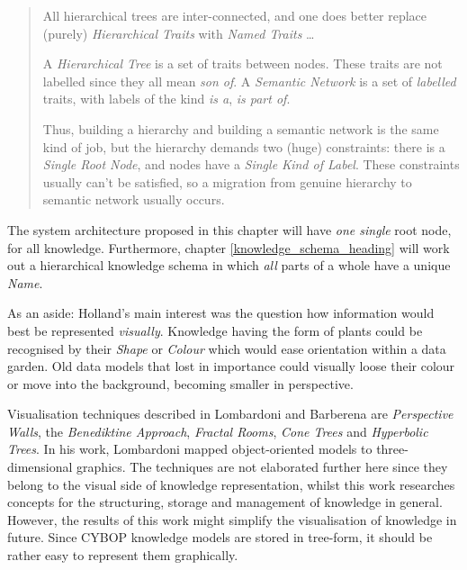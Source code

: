 \begin{quote}
    All hierarchical trees are inter-connected, and one does better replace
    (purely) \emph{Hierarchical Traits} with \emph{Named Traits} \ldots

    A \emph{Hierarchical Tree} is a set of traits between nodes. These traits
    are not labelled since they all mean \emph{son of}.
    A \emph{Semantic Network} is a set of \emph{labelled} traits, with labels
    of the kind \emph{is a}, \emph{is part of}.

    Thus, building a hierarchy and building a semantic network is the same kind
    of job, but the hierarchy demands two (huge) constraints: there is a
    \emph{Single Root Node}, and nodes have a \emph{Single Kind of Label}.
    These constraints usually can't be satisfied, so a migration from genuine
    hierarchy to semantic network usually occurs.
\end{quote}

The system architecture proposed in this chapter will have \emph{one single}
root node, for all knowledge. Furthermore, chapter \ref{knowledge_schema_heading}
will work out a hierarchical knowledge schema in which \emph{all} parts of a
whole have a unique \emph{Name}.

As an aside: Holland's main interest was the question how information would best
be represented \emph{visually}. Knowledge having the form of plants could be
recognised by their \emph{Shape} or \emph{Colour} which would ease orientation
within a data garden. Old data models that lost in importance could visually
loose their colour or move into the background, becoming smaller in perspective.

Visualisation techniques described in Lombardoni \cite{lombardoni} and Barberena
\cite{barberena} are \emph{Perspective Walls}, the \emph{Benediktine Approach},
\emph{Fractal Rooms}, \emph{Cone Trees} and \emph{Hyperbolic Trees}. In his
work, Lombardoni mapped object-oriented models to three-dimensional graphics.
The techniques are not elaborated further here since they belong to the visual
side of knowledge representation, whilst this work researches concepts for the
structuring, storage and management of knowledge in general. However, the
results of this work might simplify the visualisation of knowledge in future.
Since CYBOP knowledge models are stored in tree-form, it should be rather easy
to represent them graphically.
